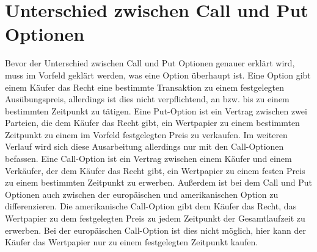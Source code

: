 \documentclass[12pt,titlepage]{article}
\begin{document}
\section{Unterschied zwischen Call und Put Optionen}
Bevor der Unterschied zwischen Call und Put Optionen genauer erklärt wird, muss im Vorfeld geklärt werden, was eine Option überhaupt ist. Eine Option gibt einem Käufer das Recht eine bestimmte Transaktion zu einem festgelegten Ausübungspreis, allerdings ist dies nicht verpflichtend, an bzw. bis zu einem bestimmten Zeitpunkt zu tätigen.
Eine Put-Option ist ein Vertrag zwischen zwei Parteien, die dem Käufer das Recht gibt, ein Wertpapier zu einem bestimmten Zeitpunkt zu einem im Vorfeld festgelegten Preis zu verkaufen.
Im weiteren Verlauf wird sich diese Ausarbeitung allerdings nur mit den Call-Optionen befassen.
Eine Call-Option ist ein Vertrag zwischen einem Käufer und einem Verkäufer, der dem Käufer das Recht gibt, ein Wertpapier zu einem festen Preis zu einem bestimmten Zeitpunkt zu erwerben.
Außerdem ist bei dem Call und Put Optionen auch zwischen der europäischen und amerikanischen Option zu differenzieren.
Die amerikanische Call-Option gibt dem Käufer das Recht, das Wertpapier zu dem festgelegten Preis zu jedem Zeitpunkt der Gesamtlaufzeit zu erwerben.
Bei der europäischen Call-Option ist dies nicht möglich, hier kann der Käufer das Wertpapier nur zu einem festgelegten Zeitpunkt kaufen.
\\\\
\end{document}
